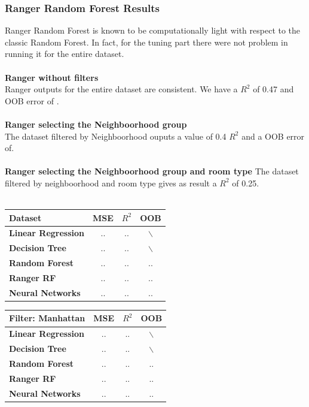 \documentclass{FR16}
\begin{document}
\subsubsection{Ranger Random Forest Results}
Ranger Random Forest is known to be computationally light with respect to the classic Random Forest. In fact, for the tuning part there were not problem in running it for the entire dataset. 
\\\\ \textbf{Ranger without filters}\\
Ranger outputs for the entire dataset are consistent. We have a $R^2$ of 0.47 and OOB error of .
\\\\
\textbf{Ranger selecting the Neighboorhood group}\\
The dataset filtered by Neighboorhood ouputs a value of 0.4 $R^2$ and a OOB error of.
\\\\ 
\textbf{Ranger selecting the Neighboorhood group and room type}
The dataset filtered by neighboorhood and room type gives as result a $R^2$ of 0.25.
\\\\
\begin{center}
\begin{tabular}{l c c c }
\arrayrulecolor{Azzurro}
\hline
{\bfseries Dataset
} & MSE & $R^2$ & OOB \\
\hline
{\bfseries Linear Regression} & .. & .. & $\backslash$ \\
{\bfseries Decision Tree} & .. & .. & $\backslash$ \\
{\bfseries Random Forest} & .. & .. & .. \\
{\bfseries Ranger RF} & .. & .. & .. \\
{\bfseries Neural Networks} & .. & .. & .. \\
\hline
\end{tabular}
\end{center}

\begin{center}
\begin{tabular}{l c c c }
\arrayrulecolor{Azzurro}
\hline
{\bfseries Filter: Manhattan
} & MSE & $R^2$ & OOB \\
\hline
{\bfseries Linear Regression} & .. & .. & $\backslash$ \\
{\bfseries Decision Tree} & .. & .. & $\backslash$ \\
{\bfseries Random Forest} & .. & .. & .. \\
{\bfseries Ranger RF} & .. & .. & .. \\
{\bfseries Neural Networks} & .. & .. & .. \\
\hline
\end{tabular}
\end{center}
\end{document}
